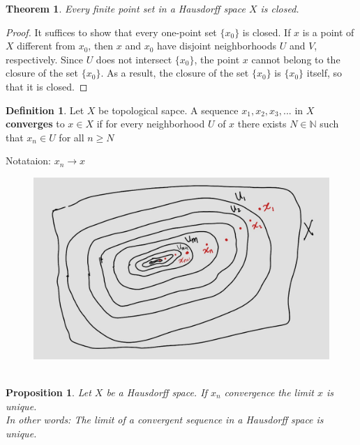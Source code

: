 \documentclass[
]{book}
\newtheorem{theorem}{Theorem}[chapter]
\newtheorem{proposition}{Proposition}[chapter]
\theoremstyle{definition}
\newtheorem{definition}{Definition}[chapter]
\theoremstyle{definition}
\theoremstyle{definition}
\theoremstyle{definition}
\theoremstyle{remark}
\begin{document}
\begin{theorem}
\protect\hypertarget{thm:unnamed-chunk-80}{}\label{thm:unnamed-chunk-80}Every finite point set in a Hausdorff space \(X\) is closed.
\end{theorem}

\begin{proof}
It suffices to show that every one-point set \(\{x_0\}\) is closed. If \(x\) is a point of \(X\)
different from \(x_0\), then \(x\) and \(x_0\) have disjoint neighborhoods \(U\) and \(V\), respectively.
Since \(U\) does not intersect \(\{x_0\}\), the point \(x\) cannot belong to the closure of the set \(\{x_0\}\).
As a result, the closure of the set \(\{x_0\}\) is \(\{x_0\}\) itself, so that it is closed.
\end{proof}

\begin{definition}
\protect\hypertarget{def:unnamed-chunk-82}{}\label{def:unnamed-chunk-82}Let \(X\) be topological sapce. A sequence \(x_1,x_2,x_3,...\) in \(X\) \textbf{converges} to \(x\in X\) if for every neighborhood \(U\) of \(x\) there exists \(N\in \mathbb{N}\) such that \(x_n \in U\) for all \(n\geq N\)

Notataion: \(x_n \to x\)
\end{definition}

\begin{figure}
\centering
\includegraphics{figures/figure 18.jpg}
\caption{\label{fig:fig18}\(~\)}
\end{figure}

\begin{proposition}
\protect\hypertarget{prp:unnamed-chunk-83}{}\label{prp:unnamed-chunk-83}Let \(X\) be a Hausdorff space. If \(x_n\) convergence the limit \(x\) is unique.\\
In other words: The limit of a convergent sequence in a Hausdorff space is unique.
\end{proposition}
\end{document}
